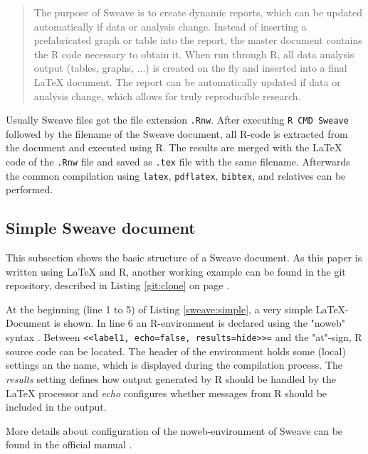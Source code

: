 \documentclass{ifacconf}
\begin{document}
\begin{quotation}
The purpose of Sweave is to create dynamic reports, 
which can be updated automatically if data or
analysis change. Instead of inserting a prefabricated
graph or table into the report, the master document
contains the R code necessary to obtain it. When run
through R, all data analysis output (tables, graphs, ...) 
is created on the fly and inserted into a final \LaTeX{}
document. The report can be automatically updated
if data or analysis change, which allows for truly reproducible research.
\end{quotation}

Usually Sweave files got the file extension \texttt{.Rnw}. 
After executing \texttt{R CMD Sweave} followed by the filename
of the Sweave document, all R-code is extracted from the document and executed using R.
The results are merged with the \LaTeX{} code of the \texttt{.Rnw} file and saved
as \texttt{.tex} file with the same filename. Afterwards the common 
compilation using \texttt{latex}, \texttt{pdflatex}, \texttt{bibtex}, and relatives
can be performed.

\subsection{Simple Sweave document}

This subsection shows the basic structure of a Sweave document. As this
paper is written using \LaTeX{} and R, another working example can be found
in the git repository, described in Listing \ref{git:clone} on page
\pageref{git:clone}.

At the beginning (line 1 to 5) of Listing \ref{sweave:simple}, a very simple
\LaTeX-Document is shown. In line 6 an R-environment is declared using 
the "noweb" syntax \citep{Ramsey_1994, Johnson_Johnson_2000}.
Between \newline \texttt{<<label1, echo=false, results=hide>>=} \newline and the
"at"-sign, R source code can be located. The header of the environment holds
some (local) settings an the name, which is displayed during the
compilation process. The \textit{results} setting defines how
output generated by R should be handled by the \LaTeX{} processor and \textit{echo}
configures whether messages from R should be included in the output.

More details about configuration of the noweb-environment of Sweave can
be found in the official manual \citep{SweaveManual}.
\end{document}
